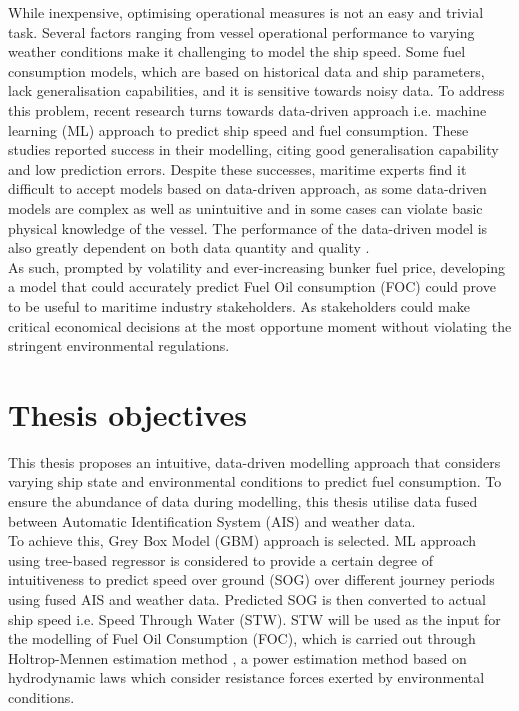 While inexpensive, optimising operational measures is not an easy and trivial task. Several factors ranging from vessel operational performance to varying weather conditions make it challenging to model the ship speed. Some fuel consumption models, which are based on historical data and ship parameters, lack generalisation capabilities, and it is sensitive towards noisy data. To address this problem, recent research turns towards data-driven approach i.e. machine learning (ML) approach to predict ship speed and fuel consumption. These studies reported success in their modelling, citing good generalisation capability and low prediction errors. Despite these successes, maritime experts find it difficult to accept models based on data-driven approach, as some data-driven models are complex as well as unintuitive and in some cases can violate basic physical knowledge of the vessel. The performance of the data-driven model is also greatly dependent on both data quantity and quality .\\      

As such, prompted by volatility and ever-increasing bunker fuel price, developing a model that could accurately predict Fuel Oil consumption (FOC) could prove to be useful to maritime industry stakeholders. As stakeholders could make critical economical decisions at the most opportune moment without violating the stringent environmental regulations. \\

\section{Thesis objectives}\label{sec:objectives}

This thesis proposes an intuitive, data-driven modelling approach that considers varying ship state and environmental conditions to predict fuel consumption. To ensure the abundance of data during modelling, this thesis utilise data fused between Automatic Identification System (AIS) and weather data.\\

To achieve this, Grey Box Model (GBM) approach is selected. ML approach using tree-based regressor is considered to provide a certain degree of intuitiveness to predict speed over ground (SOG) over different journey periods using fused AIS and weather data. Predicted SOG is then converted to actual ship speed i.e. Speed Through Water (STW). STW will be used as the input for the modelling of Fuel Oil Consumption (FOC), which is carried out through Holtrop-Mennen estimation method , a power estimation method based on hydrodynamic laws which consider resistance forces exerted by environmental conditions.\\

